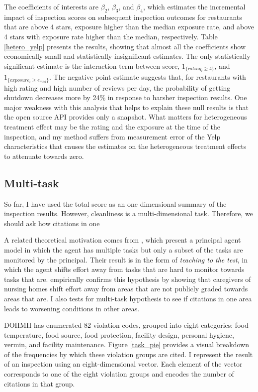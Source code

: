 \documentclass[12pt]{article}
\begin{document}
The coefficients of interests are $\beta_2$, $\beta_3$, and $\beta_4$, which estimates the incremental impact of inspection scores on subsequent inspection outcomes for restaurants that are above 4 stars, exposure higher than the median exposure rate, and above 4 stars with exposure rate higher than the median, respectively. Table \ref{hetero_yelp} presents the results, showing that almost all the coefficients show economically small and statistically insignificant estimates. The only statistically significant estimate is the interaction term between score, $1_{\{rating_i \geq 4\}}$, and $1_{\{exposure_i \geq e_{med} \}}$. The negative point estimate suggests that, for restaurants with high rating and high number of reviews per day, the probability of getting shutdown decreases more by 24\% in response to harsher inspection results. One major weakness with this analysis that helps to explain these null results is that the open source API provides only a snapshot. What matters for heterogeneous treatment effect may be the rating and the exposure at the time of the inspection, and my method suffers from measurement error of the Yelp characteristics that causes the estimates on the heterogeneous treatment effects to attenuate towards zero.

\subsection{Multi-task}

So far, I have used the total score as an one dimensional summary of the inspection results. However, cleanliness is a multi-dimensional task. Therefore, we should ask how citations in one 

A related theoretical motivation comes from \cite{Holmstrom_Milgrom_91}, which present a principal agent model in which the agent has multiple tasks but only a subset of the tasks are monitored by the principal. Their result is in the form of \emph{teaching to the test}, in which the agent shifts effort away from tasks that are hard to monitor towards tasks that are. \cite{Lu_2012} empirically confirms this hypothesis by showing that caregivers of nursing homes shift effort away from areas that are not publicly graded towards areas that are. I also tests for multi-task hypothesis to see if citations in one area leads to worsening conditions in other areas. 

DOHMH has enumerated 82 violation codes, grouped into eight categories: food temperature, food source, food protection, facility design, personal hygiene, vermin, and facility maintenance. Figure \ref{task_pie} provides a visual breakdown of the frequencies by which these violation groups are cited. I represent the result of an inspection using an eight-dimensional vector. Each element of the vector corresponds to one of the eight violation groups and encodes the number of citations in that group. 
\end{document}
